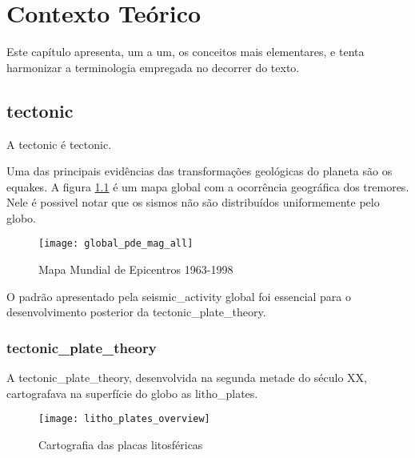 \chapter{Contexto Teórico}
\label{cap:conceitos}

Este capítulo apresenta, um a um, os conceitos mais elementares, 
e tenta harmonizar a terminologia empregada no decorrer do texto.


\section{\Gls{tectonic}}
\label{sec:02_tectonica}

A \gls{tectonic} é \glsdesc*{tectonic}.

Uma das principais evidências das transformações geológicas do planeta 
são os \glspl{equake}. A figura \ref{f:global_epicenters} \citep{img_world_epicenters}
é um mapa global com a ocorrência geográfica dos tremores. Nele é possivel notar que 
os sismos não são distribuídos uniformemente pelo globo.

\begin{figure}[H]
   \centering
   \texttt{[image: global\_pde\_mag\_all]}
   \caption[Mapa Mundial de Epicentros 1963-1998]
   		   {Mapa Mundial de Epicentros 1963-1998\footnotemark} 
   \label{f:global_epicenters}
\end{figure} 
 
O padrão apresentado pela \gls{seismic_activity} global foi essencial 
para o desenvolvimento posterior da \gls*{tectonic_plate_theory}.

\subsection{\Gls{tectonic_plate_theory}}
\label{sec:02_placas}

A \gls*{tectonic_plate_theory}, desenvolvida na segunda metade do século XX,
cartografava na superfície do globo as \glspl{litho_plate}.


\begin{figure}[H]
   \centering
   \texttt{[image: litho\_plates\_overview]}
   \caption[Cartografia das placas litosféricas]
   		   {Cartografia das placas litosféricas\footnotemark} 
   \label{f:plates_overview}
\end{figure} 
 

